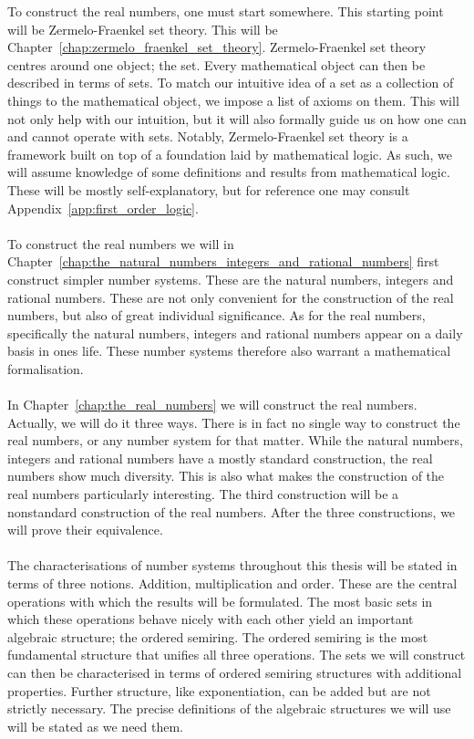 \documentclass[../main.tex]{subfiles}
\begin{document}
To construct the real numbers, one must start somewhere. This starting point will be Zermelo-Fraenkel set theory. This will be Chapter~\ref{chap:zermelo_fraenkel_set_theory}. Zermelo-Fraenkel set theory centres around one object; the set. Every mathematical object can then be described in terms of sets. To match our intuitive idea of a set as a collection of things to the mathematical object, we impose a list of axioms on them. This will not only help with our intuition, but it will also formally guide us on how one can and cannot operate with sets. Notably, Zermelo-Fraenkel set theory is a framework built on top of a foundation laid by mathematical logic. As such, we will assume knowledge of some definitions and results from mathematical logic. These will be mostly self-explanatory, but for reference one may consult Appendix~\ref{app:first_order_logic}. \\\\
To construct the real numbers we will in Chapter~\ref{chap:the_natural_numbers_integers_and_rational_numbers} first construct simpler number systems. These are the natural numbers, integers and rational numbers. These are not only convenient for the construction of the real numbers, but also of great individual significance. As for the real numbers, specifically the natural numbers, integers and rational numbers appear on a daily basis in ones life. These number systems therefore also warrant a mathematical formalisation. \\\\
In Chapter~\ref{chap:the_real_numbers} we will construct the real numbers. Actually, we will do it three ways. There is in fact no single way to construct the real numbers, or any number system for that matter. While the natural numbers, integers and rational numbers have a mostly standard construction, the real numbers show much diversity. This is also what makes the construction of the real numbers particularly interesting. The third construction will be a nonstandard construction of the real numbers. After the three constructions, we will prove their equivalence. \\\\
The characterisations of number systems throughout this thesis will be stated in terms of three notions. Addition, multiplication and order. These are the central operations with which the results will be formulated. The most basic sets in which these operations behave nicely with each other yield an important algebraic structure; the ordered semiring. The ordered semiring is the most fundamental structure that unifies all three operations. The sets we will construct can then be characterised in terms of ordered semiring structures with additional properties. Further structure, like exponentiation, can be added but are not strictly necessary. The precise definitions of the algebraic structures we will use will be stated as we need them. \\\\
\end{document}
